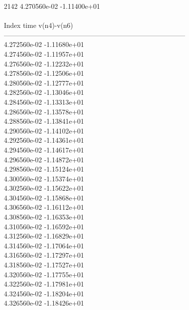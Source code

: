 2142	4.270560e-02	-1.11400e+01	\\ \hline
\\ \hline
Index   time            v(n4)-v(n6)     \\ \hline
--------------------------------------------------------------------------------\\ 	4.272560e-02	-1.11680e+01	\\ 	4.274560e-02	-1.11957e+01	\\ 	4.276560e-02	-1.12232e+01	\\ 	4.278560e-02	-1.12506e+01	\\ 	4.280560e-02	-1.12777e+01	\\ 	4.282560e-02	-1.13046e+01	\\ 	4.284560e-02	-1.13313e+01	\\ 	4.286560e-02	-1.13578e+01	\\ 	4.288560e-02	-1.13841e+01	\\ 	4.290560e-02	-1.14102e+01	\\ 	4.292560e-02	-1.14361e+01	\\ 	4.294560e-02	-1.14617e+01	\\ 	4.296560e-02	-1.14872e+01	\\ 	4.298560e-02	-1.15124e+01	\\ 	4.300560e-02	-1.15374e+01	\\ 	4.302560e-02	-1.15622e+01	\\ 	4.304560e-02	-1.15868e+01	\\ 	4.306560e-02	-1.16112e+01	\\ 	4.308560e-02	-1.16353e+01	\\ 	4.310560e-02	-1.16592e+01	\\ 	4.312560e-02	-1.16829e+01	\\ 	4.314560e-02	-1.17064e+01	\\ 	4.316560e-02	-1.17297e+01	\\ 	4.318560e-02	-1.17527e+01	\\ 	4.320560e-02	-1.17755e+01	\\ 	4.322560e-02	-1.17981e+01	\\ 	4.324560e-02	-1.18204e+01	\\ 	4.326560e-02	-1.18426e+01	\\ \hline
